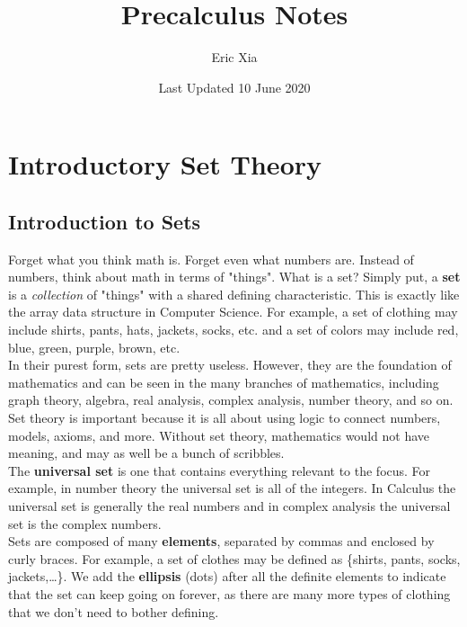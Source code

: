 \documentclass{article}
\title{Precalculus Notes}
\author{Eric Xia}
\date{Last Updated 10 June 2020}
\begin{document}
    \maketitle
    \tableofcontents
    \pagebreak


    \section{Introductory Set Theory}

        \subsection{Introduction to Sets}
            Forget what you think math is. Forget even what numbers are. Instead of numbers, think
            about math in terms of "things". What is a set? Simply put, a \textbf{set} is a
            \textit{collection} of "things" with a shared defining characteristic. This is
            exactly like the array data structure in Computer Science. For example, a set of
            clothing may include shirts, pants, hats, jackets, socks, etc. and a set of colors
            may include red, blue, green, purple, brown, etc. \\

            \noindent In their purest form, sets are pretty useless. However, they are the
            foundation of mathematics and can be seen in the many branches of mathematics,
            including graph theory, algebra, real analysis, complex analysis, number theory,
            and so on. Set theory is important because it is all about using logic to connect
            numbers, models, axioms, and more. Without set theory, mathematics would not have
            meaning, and may as well be a bunch of scribbles.\\

            \noindent The \textbf{universal set} is one that contains everything relevant to the
            focus. For example, in number theory the universal set is all of the integers.
            In Calculus the universal set is generally the real numbers and in complex analysis
            the universal set is the complex numbers.\\

            \noindent Sets are composed of many \textbf{elements}, separated by commas and enclosed
            by curly braces. For example, a set of clothes may be defined as \{shirts, pants, socks,
            jackets,\dots\}. We add the \textbf{ellipsis} (dots) after all the definite elements to
            indicate that the set can keep going on forever, as there are many more types of clothing
            that we don't need to bother defining.
\end{document}
